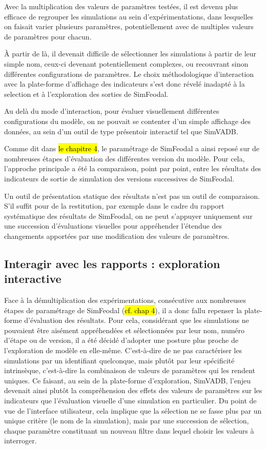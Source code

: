 	Avec la multiplication des valeurs de paramètres testées, il est devenu plus efficace de regrouper les simulations au sein d'expérimentations, dans lesquelles on faisait varier plusieurs paramètres, potentiellement avec de multiples valeurs de paramètres pour chacun.

	À partir de là, il devenait difficile de sélectionner les simulations à partir de leur simple nom, ceux-ci devenant potentiellement complexes, ou recouvrant sinon différentes configurations de paramètres.
	Le choix méthodologique d'interaction avec la plate-forme d'affichage des indicateurs s'est donc révelé inadapté à la selection et à l'exploration des sorties de SimFeodal.

	Au delà du mode d'interaction, pour évaluer visuellement différentes configurations du modèle, on ne pouvait se contenter d'un simple affichage des données, au sein d'un outil de type présentoir interactif tel que SimVADB.

	Comme dit dans \hl{le chapitre 4}, le paramétrage de SimFeodal a ainsi reposé sur de nombreuses étapes d'évaluation des différentes version du modèle.
	Pour cela, l'approche principale a été la comparaison, point par point, entre les résultats des indicateurs de sortie de simulation des versions successives de SimFeodal.

	Un outil de présentation statique des résultats n'est pas un outil de comparaison.
	S'il suffit pour de la restitution, par exemple dans le cadre du rapport systématique des résultats de SimFeodal, on ne peut s'appuyer uniquement sur une succession d'évaluations visuelles pour appréhender l'étendue des changements apportées par une modification des valeurs de paramètres.

	\subsection{Interagir avec les rapports : exploration interactive}\label{subsec:explo-interactive}

	Face à la démultiplication des expérimentations, consécutive aux nombreuses étapes de paramétrage de SimFeodal (\hl{cf. chap 4}), il a donc fallu repenser la plate-forme d'évaluation des résultats.
	Pour cela, considérant que les simulations ne pouvaient être aisément appréhendées et sélectionnées par leur nom, numéro d'étape ou de version, il a été décidé d'adopter une posture plus proche de l'exploration de modèle en elle-même.
	C'est-à-dire de ne pas caractériser les simulations par un identifiant quelconque, mais plutôt par leur spécificité intrinsèque, c'est-à-dire la combinaison de valeurs de paramètres qui les rendent uniques.
	Ce faisant, au sein de la plate-forme d'exploration, SimVADB, l'enjeu devenait ainsi plutôt la compréhension des effets des valeurs de paramètres sur les indicateurs que l'évaluation visuelle d'une simulation en particulier.
	Du point de vue de l'interface utilisateur, cela implique que la sélection ne se fasse plus par un unique critère (le nom de la simulation), mais par une succession de sélection, chaque paramètre constituant un nouveau filtre dans lequel choisir les valeurs à interroger.

